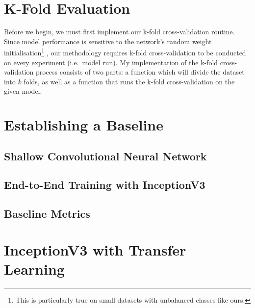 \section{K-Fold Evaluation}

Before we begin, we must first implement our k-fold cross-validation routine. Since model performance is sensitive to the network's random weight initialisation\footnote{This is particularly true on small datasets with unbalanced classes like ours.} \autocite{Narkhede2022}, our methodology requires k-fold cross-validation to be conducted on every experiment (i.e.\ model run). My implementation of the k-fold cross-validation process consists of two parts: a function which will divide the dataset into \(k\) folds, as well as a function that runs the k-fold cross-validation on the given model.







\section{Establishing a Baseline}

\subsection{Shallow Convolutional Neural Network}





\subsection{End-to-End Training with InceptionV3}





\subsection{Baseline Metrics}

\section{InceptionV3 with Transfer Learning}

